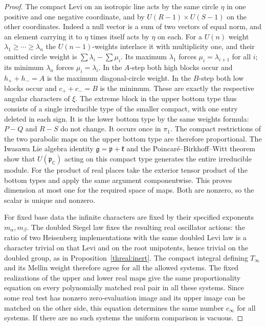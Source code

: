 \begin{proof}
The compact Levi on an isotropic line acts by the same circle
\(\eta\) in one positive and one negative coordinate, and by
\(U(R-1)\times U(S-1)\) on the other coordinates. Indeed a null
vector is a sum of two vectors of equal norm, and an element
carrying it to \(\eta\) times itself acts by \(\eta\) on each.
For a \(U(n)\) weight \(\lambda_1\ge\cdots\ge\lambda_n\) the
\(U(n-1)\)-weights interlace it with multiplicity one, and their
omitted circle weight is \(\sum\lambda_i-\sum\mu_i\). Its maximum
\(\lambda_1\) forces \(\mu_i=\lambda_{i+1}\) for all \(i\);
its minimum \(\lambda_n\) forces \(\mu_i=\lambda_i\).
In the \(A\)-step both high blocks occur and \(h_++h_-=A\) is
the maximum diagonal-circle weight. In the \(B\)-step both low
blocks occur and \(c_++c_-=B\) is the minimum. These are exactly
the respective angular characters of \(\xi\). The extreme block
in the upper bottom type thus consists of a single irreducible
type of the smaller compact, with one entry deleted in each sign.
It is the lower bottom type by the same weights formula:
\(P-Q\) and \(R-S\) do not change. It occurs once in \(\pi_1\).
The compact restrictions of the two parabolic maps on the upper
bottom type are therefore proportional. The Iwasawa Lie algebra
identity \(\mathfrak g=\mathfrak p+\mathfrak k\) and the
Poincar\'e--Birkhoff--Witt theorem show that \(U(\mathfrak p_{\mathbb C})\)
acting on this compact type generates the entire irreducible module.
For the product of real places take the exterior tensor product
of the bottom types and apply the same argument componentwise.
This proves dimension at most one for the required space of maps.
Both are nonzero, so the scalar is unique and nonzero.

For fixed base data the infinite characters are fixed by their
specified exponents \(m_\alpha,m_\beta\). The doubled Siegel law
fixes the resulting real oscillator actions: the ratio of two
Heisenberg implementations with the same doubled Levi law is a
character trivial on that Levi and on the root unipotents, hence
trivial on the doubled group, as in Proposition~\ref{threal:inert}.
The compact integral defining \(T_\infty\) and its Mellin weight
therefore agree for all the allowed systems. The fixed realizations
of the upper and lower real maps give the same proportionality
equation on every polynomially matched real pair in all these
systems. Since some real test has nonzero zero-evaluation image
and its upper image can be matched on the other side, this equation
determines the same number \(c_\infty\) for all systems. If
there are no such systems the uniform comparison is vacuous.
\end{proof}

